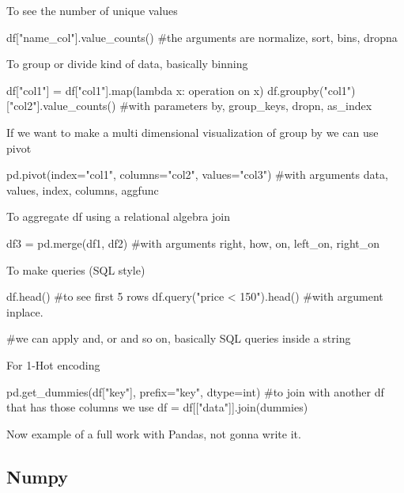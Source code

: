 To see the number of unique values

\begin{pythoncode}
    df["name_col"].value_counts() #the arguments are normalize, sort, bins, dropna
\end{pythoncode}

To group or divide kind of data, basically binning

\begin{pythoncode}
    df["col1"] = df["col1"].map(lambda x: operation on x)
    df.groupby("col1") ["col2"].value_counts() #with parameters by, group_keys, dropn, as_index
\end{pythoncode}

If we want to make a multi dimensional visualization of group by we can use pivot

\begin{pythoncode}
    

pd.pivot(index="col1", columns="col2", values="col3") #with arguments data, values, index, columns, aggfunc

\end{pythoncode}

To aggregate df using a relational algebra join

\begin{pythoncode}
    df3 = pd.merge(df1, df2) #with arguments right, how, on, left_on, right_on
\end{pythoncode}

To make queries (SQL style)

\begin{pythoncode}
    df.head() #to see first 5 rows
    df.query("price < 150").head() #with argument inplace. 

    #we can apply and, or and so on, basically SQL queries inside a string
\end{pythoncode}

For 1-Hot encoding

\begin{pythoncode}
    pd.get_dummies(df["key"], prefix="key", dtype=int) #to join with another df that has those columns we use
    df = df[["data"]].join(dummies)
\end{pythoncode}

Now example of a full work with Pandas, not gonna write it.


\subsection{Numpy}


